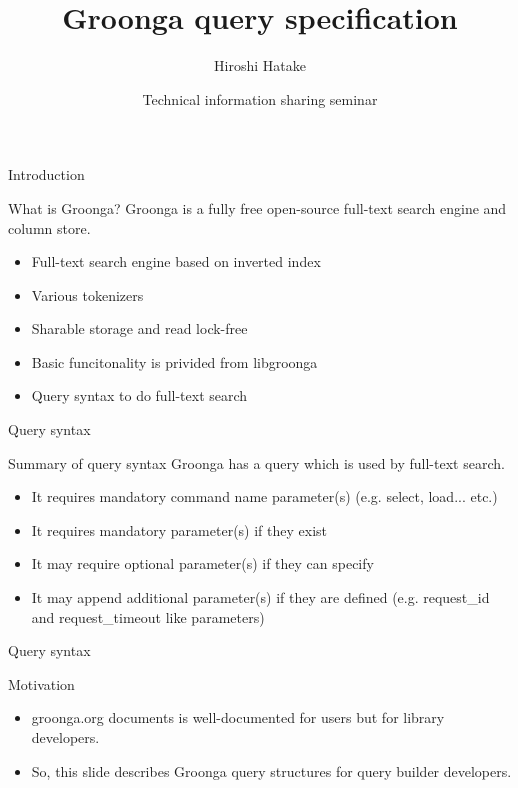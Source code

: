\documentclass[12pt, unicode]{beamer}
\title{Groonga query specification}
\author{Hiroshi Hatake}
\date[2016/03/12]{Technical information sharing seminar}
\begin{document}
\frame{\maketitle}

\begin{frame}{Introduction}
\begin{block}{What is Groonga?}
Groonga is a fully free open-source full-text search engine and column store.
\end{block}
\begin{itemize}
\item<2-> Full-text search engine based on inverted index
\item<3-> Various tokenizers
\item<4-> Sharable storage and read lock-free
\item<5-> Basic funcitonality is privided from libgroonga
\item<6-> Query syntax to do full-text search
\end{itemize}
\end{frame}

\begin{frame}{Query syntax}
\begin{block}{Summary of query syntax}
Groonga has a query which is used by full-text search.
\end{block}
\begin{itemize}
\item<2-> It requires mandatory command name parameter(s) (e.g. select, load... etc.)
\item<3-> It requires mandatory parameter(s) if they exist
\item<4-> It may require optional parameter(s) if they can specify
\item<5-> It may append additional parameter(s) if they are defined (e.g. request\_id and request\_timeout like parameters)
\end{itemize}
\end{frame}

\begin{frame}{Query syntax}
  \begin{block}{Motivation}
  \begin{itemize}
  \item<1-> groonga.org documents is well-documented for users but for library developers.
  \item<2-> So, this slide describes Groonga query structures for query builder developers.
  \end{itemize}
  \end{block}
\end{frame}
\end{document}
